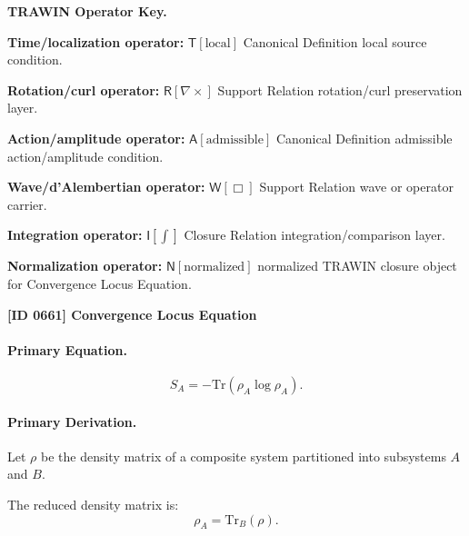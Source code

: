 \par\vspace{0.45\baselineskip}
\noindent\begin{minipage}[t]{\linewidth}
\begingroup
\small
\raggedright
\textbf{TRAWIN Operator Key.}\par
\noindent\textbf{Time/localization operator:} $\mathsf{T}\!\left[\mathrm{local}\right]$ Canonical Definition local source condition.\par
\noindent\textbf{Rotation/curl operator:} $\mathsf{R}\!\left[\nabla\times\right]$ Support Relation rotation/curl preservation layer.\par
\noindent\textbf{Action/amplitude operator:} $\mathsf{A}\!\left[\mathrm{admissible}\right]$ Canonical Definition admissible action/amplitude condition.\par
\noindent\textbf{Wave/d'Alembertian operator:} $\mathsf{W}\!\left[\Box\right]$ Support Relation wave or operator carrier.\par
\noindent\textbf{Integration operator:} $\mathsf{I}\!\left[\int\right]$ Closure Relation integration/comparison layer.\par
\noindent\textbf{Normalization operator:} $\mathsf{N}\!\left[\mathrm{normalized}\right]$ normalized TRAWIN closure object for Convergence Locus Equation.\par
\endgroup
\end{minipage}

\clearpage
\noindent\textbf{[ID 0661] Convergence Locus Equation}\par
\vspace{0.35em}
\paragraph{Primary Equation.}
\begin{equation}
S_A = -\mathrm{Tr}(\rho_A \log \rho_A).
\end{equation}

\paragraph{Primary Derivation.}
Let $\rho$ be the density matrix of a composite system partitioned into subsystems $A$ and $B$.

The reduced density matrix is:
\begin{equation}
\rho_A = \mathrm{Tr}_B(\rho).
\end{equation}


